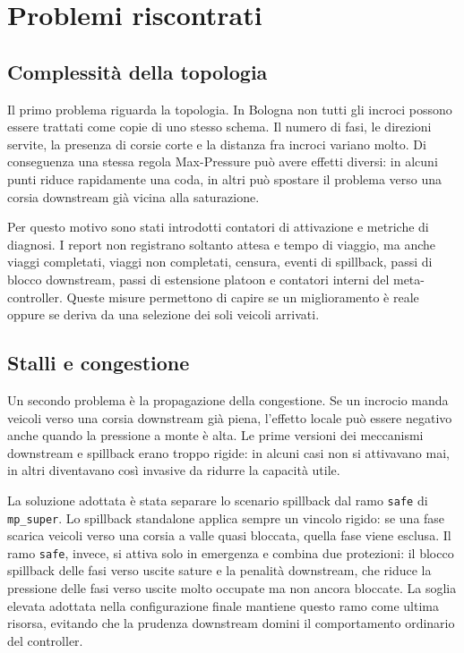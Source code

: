 \documentclass[12pt,a4paper,oneside]{report}
\numberwithin{equation}{chapter}
\begin{document}
\section{Problemi riscontrati}

\subsection{Complessità della topologia}

Il primo problema riguarda la topologia. In Bologna non tutti gli incroci
possono essere trattati come copie di uno stesso schema. Il numero di fasi, le
direzioni servite, la presenza di corsie corte e la distanza fra incroci
variano molto. Di conseguenza una stessa regola Max-Pressure può avere effetti
diversi: in alcuni punti riduce rapidamente una coda, in altri può spostare il
problema verso una corsia downstream già vicina alla saturazione.

Per questo motivo sono stati introdotti contatori di attivazione e metriche di
diagnosi. I report non registrano soltanto attesa e tempo di viaggio, ma anche
viaggi completati, viaggi non completati, censura, eventi di spillback, passi di
blocco downstream, passi di estensione platoon e contatori interni del
meta-controller. Queste misure permettono di capire se un miglioramento è reale
oppure se deriva da una selezione dei soli veicoli arrivati.

\subsection{Stalli e congestione}

Un secondo problema è la propagazione della congestione. Se un incrocio manda
veicoli verso una corsia downstream già piena, l'effetto locale può essere
negativo anche quando la pressione a monte è alta. Le prime versioni dei
meccanismi downstream e spillback erano troppo rigide: in alcuni casi non si
attivavano mai, in altri diventavano così invasive da ridurre la capacità utile.

La soluzione adottata è stata separare lo scenario spillback dal ramo
\texttt{safe} di \texttt{mp\_super}. Lo spillback standalone applica sempre un
vincolo rigido: se una fase scarica veicoli verso una corsia a valle quasi
bloccata, quella fase viene esclusa. Il ramo \texttt{safe}, invece, si attiva
solo in emergenza e combina due protezioni: il blocco spillback delle fasi verso
uscite sature e la penalità downstream, che riduce la pressione delle fasi verso
uscite molto occupate ma non ancora bloccate. La soglia elevata adottata nella
configurazione finale mantiene questo ramo come ultima risorsa, evitando che la
prudenza downstream domini il comportamento ordinario del controller.
\end{document}
